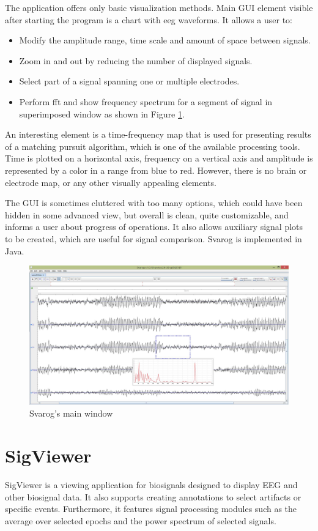 The application offers only basic visualization methods. Main GUI element
visible after starting the program is a chart with \gls{eeg} waveforms. It allows a user to:
\begin{itemize}
	\item Modify the amplitude range, time scale and amount of space between signals.
	\item Zoom in and out by reducing the number of displayed signals. 
	\item Select part of a signal spanning one or multiple electrodes.
	\item Perform \gls{fft} and show frequency spectrum for a segment of signal in superimposed window as shown in Figure \ref{fig:svarog}.
\end{itemize}
An interesting element is a time-frequency map that is
used for presenting results of a matching pursuit algorithm, which is one of the available
processing tools. Time is plotted on a horizontal axis, frequency on a vertical axis and
amplitude is represented by a color in a range from blue to red. However, there is
no brain or electrode map, or any other visually appealing elements.

The GUI is sometimes cluttered with too many options, which could have been
hidden in some advanced view, but overall is clean, quite customizable, and
informs a user about progress of operations. It also allows auxiliary
signal plots to be created, which are useful for signal comparison. Svarog is implemented in Java.

\begin{figure}[htb]
	\centering
	\includegraphics[width=0.8\linewidth]{fig/svarog.jpg}
	\caption{Svarog's main window}
	\label{fig:svarog}
\end{figure}

\section{SigViewer}
SigViewer is a viewing application for biosignals designed to display EEG and other biosignal data. It also supports creating annotations to select artifacts or specific events. Furthermore, it features signal processing modules such as the average over selected epochs and the power spectrum of selected signals. 

